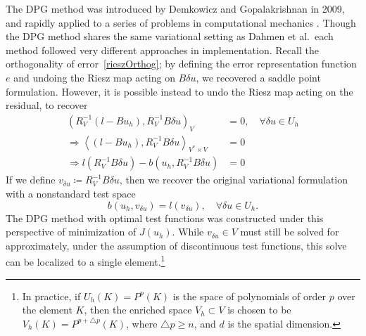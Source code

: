 \documentclass[final,leqno]{siamltex}
\newcommand{\LRp}[1]{\left( #1 \right)}
\newcommand{\LRa}[1]{\left\langle #1 \right\rangle}
\begin{document}
The DPG method was introduced by Demkowicz and Gopalakrishnan in 2009, and rapidly applied to a series of problems in computational mechanics \cite{DPG2,DPG3,DPG4,maxwellDPG,stokesDPG}.  Though the DPG method shares the same variational setting as Dahmen et al.\, each method followed very different approaches in implementation.  Recall the orthogonality of error~\eqref{rieszOrthog}; by defining the error representation function $e$ and undoing the Riesz map acting on $B\delta u$, we recovered a saddle point formulation.  However, it is possible instead to undo the Riesz map acting on the residual, to recover
\begin{align*}
\LRp{R_V^{-1}\LRp{l-Bu_h},R_V^{-1}B\delta u}_V &= 0, \quad \forall \delta u \in U_h\\
\Rightarrow \LRa{\LRp{l-Bu_h},R_V^{-1}B\delta u}_{V^*\times V} &= 0\\
\Rightarrow l\LRp{R_V^{-1}B\delta u}-b\LRp{u_h,R_V^{-1}B\delta u} &= 0
\end{align*}
If we define $v_{\delta u} \coloneqq R_V^{-1}B\delta u$, then we recover the original variational formulation with a nonstandard test space
\[
b(u_h,v_{\delta u}) = l(v_{\delta u}), \quad \forall \delta u \in U_h.
\]
The DPG method with optimal test functions was constructed under this perspective of minimization of $J(u_h)$.  While $v_{\delta u} \in V$ must still be solved for approximately, under the assumption of discontinuous test functions, this solve can be localized to a single element.\footnote{In practice, if $U_h(K) = P^p(K)$ is the space of polynomials of order $p$ over the element $K$, then the enriched space $V_h \subset V$ is chosen to be $V_h(K) = P^{p+\triangle p}(K)$, where $\triangle p \geq n$, and $d$ is the spatial dimension.}
\end{document}
